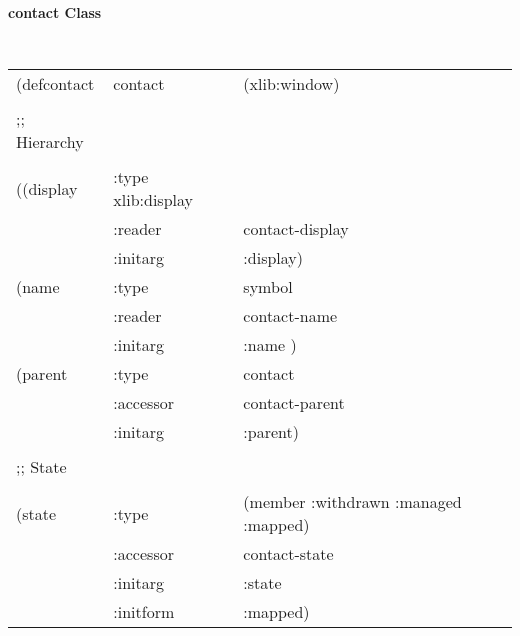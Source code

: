 {\large {\bf contact \hfill Class}} 
\begin{flushright}
\parbox[t]{6.125in}{
\tt
\begin{tabular}{lll}
\raggedright
(defcontact & contact & (xlib:window) \\
&\\
;; Hierarchy \\
&\\
  ((display &            :type xlib:display \\
&                        :reader & contact-display \\
&                        :initarg &  :display) \\
   (name &               :type & symbol \\
&                        :reader &  contact-name \\
&                        :initarg &  :name ) \\
   (parent &             :type & contact \\
&                        :accessor &  contact-parent \\
&                        :initarg &  :parent)\\
&\\
;; State \\
&\\
   (state &          :type & (member :withdrawn :managed :mapped)\\
&                        :accessor & contact-state \\
&                        :initarg &  :state \\
&                        :initform & :mapped) 
\end{tabular}}


\end{flushright}
